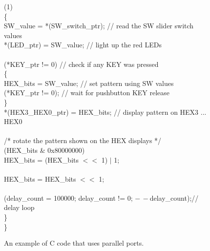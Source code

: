 \begin{figure}[h!]
\begin{center}
\begin{minipage}[t]{12.5 cm}
\begin{tabbing}
 (1)\\
\>\{\\
\>\>SW\_value = *(SW\_switch\_ptr); \>\>// read the SW slider switch values\\
\>\>*(LED\_ptr) = SW\_value; \>\>// light up the red LEDs\\
~\\
\> (*KEY\_ptr != 0) \>\>// check if any KEY was pressed\\
\>\>\{\\
\>\>\>HEX\_bits = SW\_value; \>// set pattern using SW values\\
\>\> (*KEY\_ptr != 0); \>// wait for pushbutton KEY release\\
\>\>\}\\
\>\>*(HEX3\_HEX0\_ptr) = HEX\_bits; \>\>// display pattern on HEX3 ... HEX0\\
~\\
\>\>/* rotate the pattern shown on the HEX displays */\\
\> (HEX\_bits \& 0x80000000)\\
\>\>\>HEX\_bits = (HEX\_bits $<<$ 1) $\mid$ 1;\\
\>\\
\>\>\>HEX\_bits = HEX\_bits $<<$ 1;\\
~\\
\> (delay\_count = 100000; delay\_count != 0; $-\,-$delay\_count);\hspace{.75
cm}// delay loop\\
\>\} \\
\}\\
\end{tabbing}
\end{minipage}
\end{center}
	\vspace{-0.33in}\caption{An example of C code that uses parallel ports.}
   \label{fig:getting_started_C}
\end{figure}
\pagebreak
\clearpage
\newpage